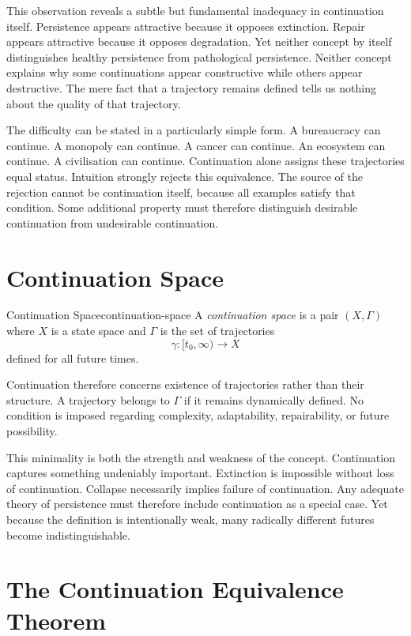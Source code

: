 \documentclass[12pt,twoside,openright]{book}
\begin{document}
This observation reveals a subtle but fundamental
inadequacy in continuation itself. Persistence appears
attractive because it opposes extinction. Repair appears
attractive because it opposes degradation. Yet neither
concept by itself distinguishes healthy persistence from
pathological persistence. Neither concept explains why some
continuations appear constructive while others appear
destructive. The mere fact that a trajectory remains
defined tells us nothing about the quality of that
trajectory.

The difficulty can be stated in a particularly simple form.
A bureaucracy can continue. A monopoly can continue. A
cancer can continue. An ecosystem can continue. A
civilisation can continue. Continuation alone assigns these
trajectories equal status. Intuition strongly rejects this
equivalence. The source of the rejection cannot be
continuation itself, because all examples satisfy that
condition. Some additional property must therefore
distinguish desirable continuation from undesirable
continuation.

\section{Continuation Space}
\label{sec:ch10-space}

\begin{definition}{Continuation Space}{continuation-space}
  A \emph{continuation space} is a pair $(X,\Gamma)$ where
  $X$ is a state space and $\Gamma$ is the set of
  trajectories
  \[
    \gamma : [t_0,\infty) \to X
  \]
  defined for all future times.
\end{definition}

Continuation therefore concerns existence of trajectories
rather than their structure. A trajectory belongs to
$\Gamma$ if it remains dynamically defined. No condition is
imposed regarding complexity, adaptability, repairability,
or future possibility.

This minimality is both the strength and weakness of the
concept. Continuation captures something undeniably
important. Extinction is impossible without loss of
continuation. Collapse necessarily implies failure of
continuation. Any adequate theory of persistence must
therefore include continuation as a special case. Yet
because the definition is intentionally weak, many radically
different futures become indistinguishable.

\section{The Continuation Equivalence Theorem}
\label{sec:ch10-equivalence}
\end{document}
